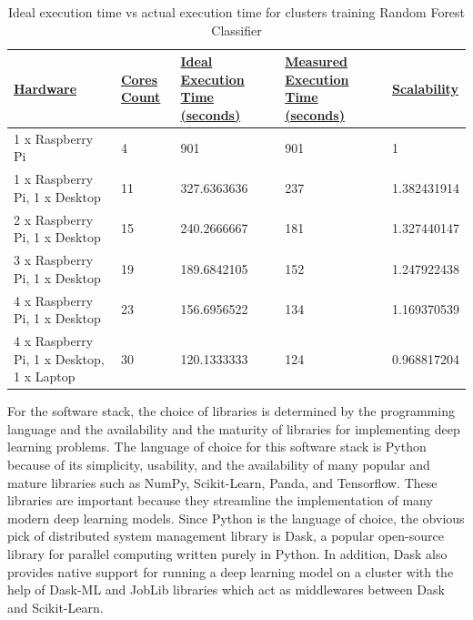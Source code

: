 \documentclass[conference]{IEEEtran}
\begin{document}
        \begin{table}[]
            \begin{tabular}{|l|l|l|l|l|}
            \hline
            {\ul \textbf{Hardware}}                   & {\ul \textbf{Cores Count}} & {\ul \textbf{Ideal Execution Time (seconds)}} & {\ul \textbf{Measured Execution Time (seconds)}} & {\ul \textbf{Scalability}} \\ \hline
            1 x Raspberry Pi                          & 4                          & 901                                           & 901                                              & 1                          \\ \hline
            1 x Raspberry Pi, 1 x Desktop             & 11                         & 327.6363636                                   & 237                                              & 1.382431914                \\ \hline
            2 x Raspberry Pi, 1 x Desktop             & 15                         & 240.2666667                                   & 181                                              & 1.327440147                \\ \hline
            3 x Raspberry Pi, 1 x Desktop             & 19                         & 189.6842105                                   & 152                                              & 1.247922438                \\ \hline
            4 x Raspberry Pi, 1 x Desktop             & 23                         & 156.6956522                                   & 134                                              & 1.169370539                \\ \hline
            4 x Raspberry Pi, 1 x Desktop, 1 x Laptop & 30                         & 120.1333333                                   & 124                                              & 0.968817204                \\ \hline
            \end{tabular}
            \caption{Ideal execution time vs actual execution time for clusters training Random Forest Classifier}
        \end{table}
        
        For the software stack, the choice of libraries is determined by the programming language and the availability and the maturity of libraries for implementing deep learning problems. The language of choice for this software stack is Python because of its simplicity, usability, and the availability of many popular and mature libraries such as NumPy, Scikit-Learn, Panda, and Tensorflow. These libraries are important because they streamline the implementation of many modern deep learning models. Since Python is the language of choice, the obvious pick of distributed system management library is Dask, a popular open-source library for parallel computing written purely in Python. In addition, Dask also provides native support for running a deep learning model on a cluster with the help of Dask-ML and JobLib libraries which act as middlewares between Dask and Scikit-Learn. 
\end{document}
